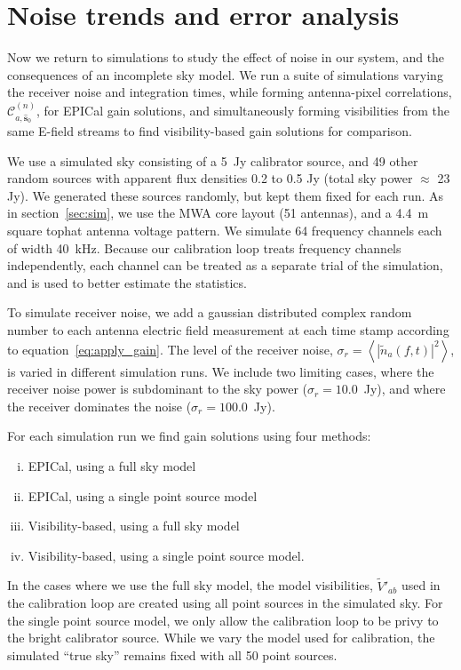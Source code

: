 \documentclass[a4paper,fleqn,usenatbib]{../mnras}
\newcommand{\spix}{\ensuremath{\hat{\mathbf{s}}_{0}}}
\newcommand{\Cna}[1][n]{\ensuremath{\mathcal{C}^{(#1)}_{a,\spix}}}
\newcommand{\V}{\ensuremath{\widetilde{V}}}
\begin{document}
\section{Noise trends and error analysis}\label{sec:noise}
Now we return to simulations to study the effect of noise in our system, and the consequences of an incomplete sky model. We run a suite of simulations varying the receiver noise and integration times, while forming antenna-pixel correlations, $\Cna$, for EPICal gain solutions, and simultaneously forming visibilities from the same E-field streams to find visibility-based gain solutions for comparison. 

We use a simulated sky consisting of a 5~Jy calibrator source, and 49 other random sources with apparent flux densities 0.2 to 0.5 Jy (total sky power $\approx$ 23 Jy). We generated these sources randomly, but kept them fixed for each run. As in section~\ref{sec:sim}, we use the MWA core layout (51 antennas), and a 4.4~m square tophat antenna voltage pattern. We simulate 64 frequency channels each of width 40~kHz. Because our calibration loop treats frequency channels independently, each channel can be treated as a separate trial of the simulation, and is used to better estimate the statistics.

To simulate receiver noise, we add a gaussian distributed complex random number to each antenna electric field measurement at each time stamp according to equation~\ref{eq:apply_gain}. The level of the receiver noise, $\sigma_r = \left<\left|\widetilde{n}_a(f,t)\right|^2\right>$, is varied in different simulation runs. We include two limiting cases, where the receiver noise power is subdominant to the sky power ($\sigma_r = 10.0$~Jy), and where the receiver dominates the noise ($\sigma_r=100.0$~Jy).

For each simulation run we find gain solutions using four methods:
\begin{enumerate}[i.]
\item EPICal, using a full sky model
\item EPICal, using a single point source model
\item Visibility-based, using a full sky model
\item Visibility-based, using a single point source model.
\end{enumerate}
In the cases where we use the full sky model, the model visibilities, $\V'_{ab}$ used in the calibration loop are created using all point sources in the simulated sky. For the single point source model, we only allow the calibration loop to be privy to the bright calibrator source. While we vary the model used for calibration, the simulated ``true sky'' remains fixed with all 50 point sources.
\end{document}
